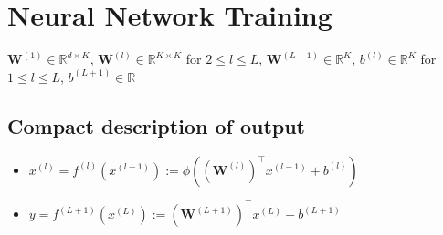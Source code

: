 
\section{Neural Network Training}







$\mathbf{W}^{(1)} \in \mathbb{R}^{d \times K}$, $\mathbf{W}^{(l)} \in \mathbb{R}^{K \times K}$ for $2 \leq l \leq L$, $\mathbf{W}^{(L+1)} \in \mathbb{R}^{K}$, $b^{(l)} \in \mathbb{R}^{K}$ for $1 \leq l \leq L$, $b^{(L+1)} \in \mathbb{R}$

\subsection*{Compact description of output}

\begin{itemize}
  \item $x^{(l)}=f^{(l)}\left(x^{(l-1)}\right):=\phi\left(\left(\mathbf{W}^{(l)}\right)^{\top} x^{(l-1)}+b^{(l)}\right)$
  \item $y=f^{(L+1)}\left(x^{(L)}\right):=\left(\mathbf{W}^{(L+1)}\right)^{\top} x^{(L)}+b^{(L+1)}$
\end{itemize}

